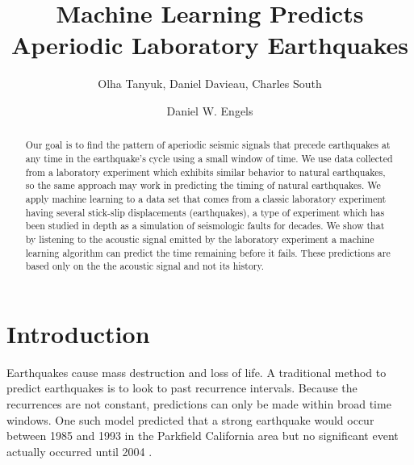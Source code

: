 \documentclass[]{llncs} %
\begin{document}

\title{Machine Learning Predicts Aperiodic Laboratory Earthquakes}
\author{Olha Tanyuk, Daniel Davieau, Charles South \and Daniel W. Engels}


\maketitle
\begin{abstract}
Our goal is to find the pattern of aperiodic seismic signals that precede earthquakes at any time in the earthquake’s cycle using a small window of time. We use data collected from a laboratory experiment which exhibits similar behavior to natural earthquakes, so the same approach may work in predicting the timing of natural earthquakes. We apply machine learning to a data set that comes from a classic laboratory experiment having several stick-slip displacements (earthquakes), a type of experiment which has been studied in depth as a simulation of seismologic faults for decades. We show that by listening to the acoustic signal emitted by the laboratory experiment a machine learning algorithm can predict the time remaining before it fails. These predictions are based only on the the acoustic signal and not its history. \par
	
\end{abstract}

\section{Introduction}
Earthquakes cause mass destruction and loss of life. A traditional method to predict earthquakes is to look to past recurrence intervals. Because the recurrences are not constant, predictions can only be made within broad time windows. One such model predicted that a strong earthquake would occur between 1985 and 1993 in the Parkfield California area but no significant event actually occurred until 2004 \cite{Jackson}. \par
\end{document}
